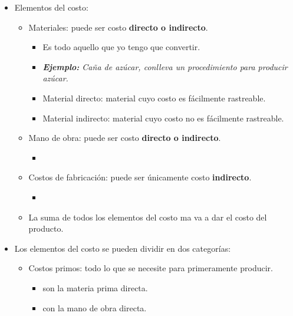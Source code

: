 \begin{itemize}
    \item Elementos del costo: 
        \begin{itemize}
            \item Materiales: puede ser costo \textbf{directo o indirecto}.
                \begin{itemize}
                    \item Es todo aquello que yo tengo que convertir.
                    \item \emph{\textbf{Ejemplo: }Caña de azúcar, conlleva un procedimiento para producir azúcar.}
                    \item Material directo: material cuyo costo es fácilmente rastreable.
                    \item Material indirecto: material cuyo costo no es fácilmente rastreable.
                \end{itemize}
            \item Mano de obra: puede ser costo \textbf{directo o indirecto}.
                \begin{itemize}
                    \item  
                \end{itemize}
            \item Costos de fabricación: puede ser únicamente costo \textbf{indirecto}.
                \begin{itemize}
                    \item 
                \end{itemize}
        \end{itemize}
        \begin{itemize}[label=\#]
            \item La suma de todos los elementos del costo ma va a dar el costo del producto.
        \end{itemize}
    
    \item Los elementos del costo se pueden dividir en dos categorías:
        \begin{itemize}
            \item Costos primos: todo lo que se necesite para primeramente producir.
                \begin{itemize}
                    \item son la materia prima directa.
                    \item con la mano de obra directa.
                \end{itemize}
            

\end{itemize}
\end{itemize}
